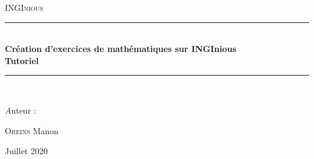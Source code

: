 \begin{titlepage}

\begin{center}
\newcommand{\HRule}{\rule{\linewidth}{0.5mm}}

\vspace{1cm}
\textsc{\LARGE INGInious}
\vspace{7cm}

\HRule \\[1cm]
{\huge \bfseries Création d'exercices de mathématiques sur INGInious\\ \vspace{0.4cm} Tutoriel\\[1cm]}
\HRule \\
\vspace{1.5cm}

\large{\emph Auteur : }\\
\vspace{0.3cm}

\textsc{Oreins} Manon\\

\vfill


\large Juillet 2020
\end{center}
\end{titlepage}